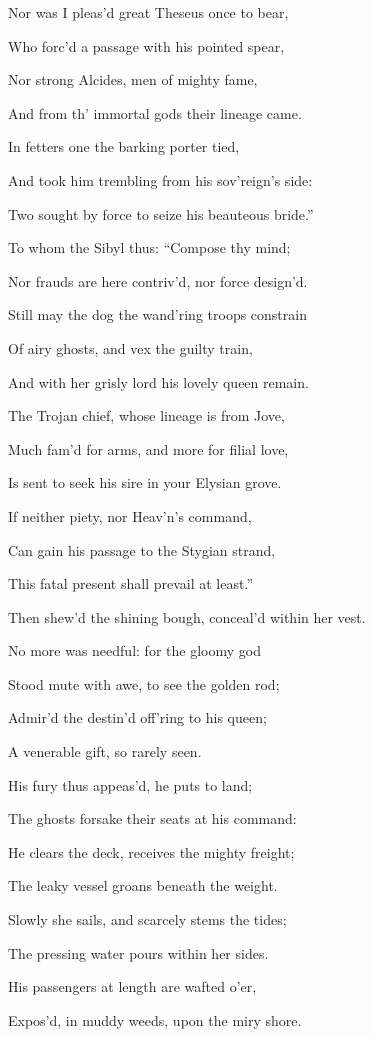 Nor was I pleas’d great Theseus once to bear,

Who forc’d a passage with his pointed spear,

Nor strong Alcides, men of mighty fame,

And from th’ immortal gods their lineage came.

In fetters one the barking porter tied,

And took him trembling from his sov’reign’s side:

Two sought by force to seize his beauteous bride.”

To whom the Sibyl thus: “Compose thy mind;

Nor frauds are here contriv’d, nor force design’d.

Still may the dog the wand’ring troops constrain

Of airy ghosts, and vex the guilty train,

And with her grisly lord his lovely queen remain.

The Trojan chief, whose lineage is from Jove,

Much fam’d for arms, and more for filial love,

Is sent to seek his sire in your Elysian grove.

If neither piety, nor Heav’n’s command,

Can gain his passage to the Stygian strand,

This fatal present shall prevail at least.”

Then shew’d the shining bough, conceal’d within her vest.

No more was needful: for the gloomy god

Stood mute with awe, to see the golden rod;

Admir’d the destin’d off’ring to his queen;

A venerable gift, so rarely seen.

His fury thus appeas’d, he puts to land;

The ghosts forsake their seats at his command:

He clears the deck, receives the mighty freight;

The leaky vessel groans beneath the weight.

Slowly she sails, and scarcely stems the tides;

The pressing water pours within her sides.

His passengers at length are wafted o’er,

Expos’d, in muddy weeds, upon the miry shore.

